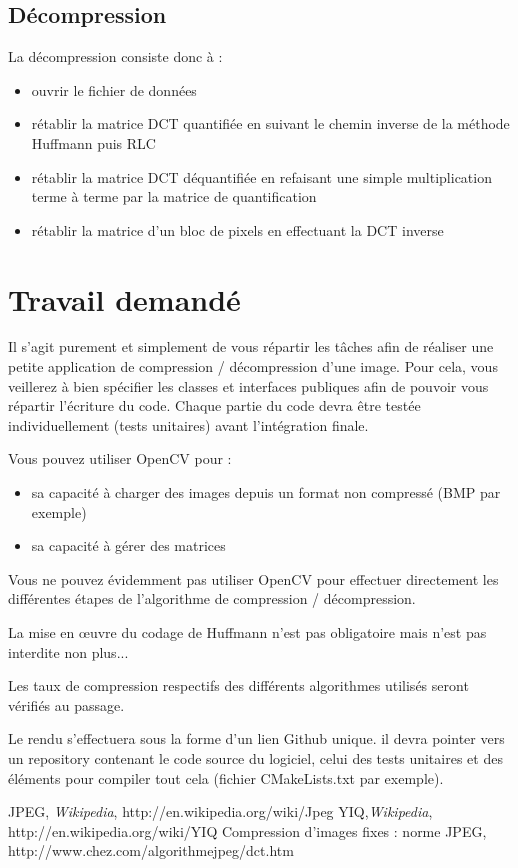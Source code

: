 \documentclass[a4paper,10pt]{article}
\begin{document}
\subsection{Décompression}

La décompression consiste donc  à :
\begin{itemize}
\item ouvrir le fichier de données
\item rétablir la matrice DCT quantifiée en suivant le chemin inverse de la méthode Huffmann puis RLC
\item rétablir la matrice DCT déquantifiée en refaisant une simple multiplication terme à terme par la matrice de quantification
\item rétablir la matrice d'un bloc de pixels en effectuant la DCT inverse
\end{itemize}

\section{Travail demandé}

Il s'agit purement et simplement de vous répartir les tâches afin de réaliser une petite application de compression / décompression d'une image. Pour cela, vous veillerez à bien spécifier les classes et interfaces publiques afin de pouvoir vous répartir l'écriture du code. Chaque partie du code devra être testée individuellement (tests unitaires) avant l'intégration finale.

Vous pouvez utiliser OpenCV pour :
\begin{itemize}
	\item sa capacité à charger des images depuis un format non compressé (BMP par exemple)
	\item sa capacité à gérer des matrices
\end{itemize}

Vous ne pouvez évidemment pas utiliser OpenCV pour effectuer directement les différentes étapes de l'algorithme de compression / décompression.

La mise en \oe uvre du codage de Huffmann n'est pas obligatoire mais n'est  pas interdite non plus...
 
Les taux de compression respectifs des différents algorithmes utilisés seront vérifiés au passage.

Le rendu s'effectuera sous la forme d'un lien Github unique. il devra pointer vers un repository contenant le code source du logiciel, celui des tests unitaires et des éléments pour compiler tout cela (fichier CMakeLists.txt par exemple).


\begin{thebibliography}{9}
 JPEG, \emph{Wikipedia}, http://en.wikipedia.org/wiki/Jpeg
 YIQ,\emph{Wikipedia}, http://en.wikipedia.org/wiki/YIQ
 Compression d'images fixes : norme JPEG, http://www.chez.com/algorithmejpeg/dct.htm
\end{thebibliography}
\end{document}
